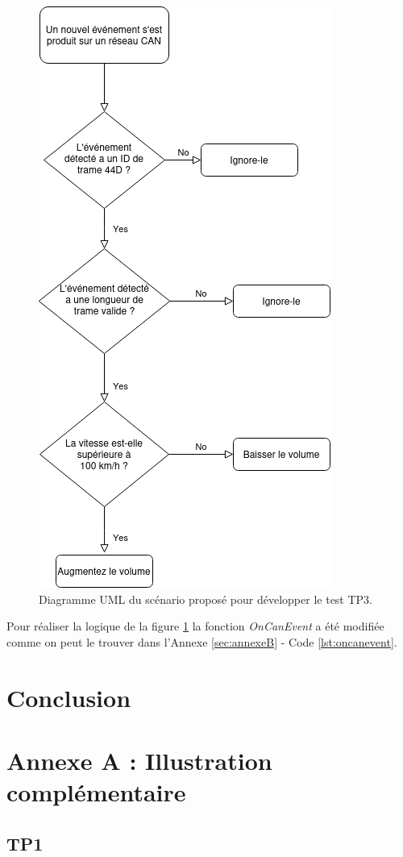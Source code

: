 \documentclass{rapportECC}
\begin{document}
\begin{figure}[H]
    \centering
    \includegraphics[width=.5\textwidth]{./images/OnCanEvent_UML.png}
    \caption{Diagramme UML du scénario proposé pour développer le test TP3.}
    \label{fig:OnCanEvent_UML}
\end{figure}

Pour réaliser la logique de la figure \ref{fig:OnCanEvent_UML} la fonction \textit{OnCanEvent} a été modifiée comme on peut le trouver dans l'Annexe \ref{sec:annexeB} - Code \ref{lst:oncanevent}.


\section{Conclusion}


%
% 


\appendix

\section{Annexe A : Illustration complémentaire}\label{sec:annexeA}

\subsection{TP1}
\end{document}
